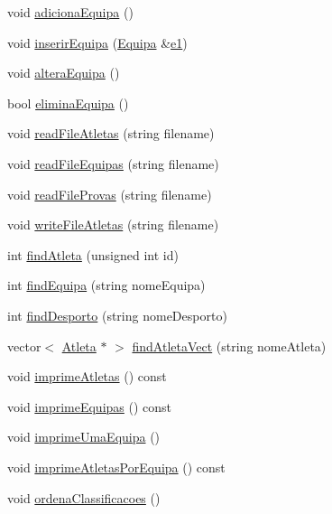 \begin{DoxyCompactItemize}
void \hyperlink{class_campeonato_a61f99e0dac86a67b21facebdc6a6d6a1}{adiciona\+Equipa} ()
\item 
void \hyperlink{class_campeonato_a5c09e9bc272f96875121ef9026c26434}{inserir\+Equipa} (\hyperlink{class_equipa}{Equipa} \&\hyperlink{main_8h_a94bd6f24df224a4dd936a7dba7521ff0}{e1})
\item 
void \hyperlink{class_campeonato_a79600008b0e5fc40b578da54519aee47}{altera\+Equipa} ()
\item 
bool \hyperlink{class_campeonato_a059f992f3a9932dbcf232541640b4b45}{elimina\+Equipa} ()
\item 
void \hyperlink{class_campeonato_a4f443b1fb65733062b40dd529d5ad63e}{read\+File\+Atletas} (string filename)
\item 
void \hyperlink{class_campeonato_a93f60ccc2608b0c99a978bc93fd881ac}{read\+File\+Equipas} (string filename)
\item 
void \hyperlink{class_campeonato_a4098bb3bde66ead9ecaa61e10aef2a5e}{read\+File\+Provas} (string filename)
\item 
void \hyperlink{class_campeonato_a8102c353a574b0ada7d35b537365a54e}{write\+File\+Atletas} (string filename)
\item 
int \hyperlink{class_campeonato_a662db361dc8464fa6ced60048e45ca1a}{find\+Atleta} (unsigned int id)
\item 
int \hyperlink{class_campeonato_a8002616a409e12a1ba2798d60c04f9dc}{find\+Equipa} (string nome\+Equipa)
\item 
int \hyperlink{class_campeonato_a64574dd8d105367c49d794a42e4a2aa8}{find\+Desporto} (string nome\+Desporto)
\item 
vector$<$ \hyperlink{class_atleta}{Atleta} $\ast$ $>$ \hyperlink{class_campeonato_abe0557f6d0fe33787a6d44e85fd8bda3}{find\+Atleta\+Vect} (string nome\+Atleta)
\item 
void \hyperlink{class_campeonato_a6a51ed1d4c6ca51bdc407144589d5894}{imprime\+Atletas} () const 
\item 
void \hyperlink{class_campeonato_a9e43dc72a8bf29c332209a37a8bdb1d8}{imprime\+Equipas} () const 
\item 
void \hyperlink{class_campeonato_a47a2b89c44b6705afa2478109d8b6b78}{imprime\+Uma\+Equipa} ()
\item 
void \hyperlink{class_campeonato_a4bbcc137067e9f72c169e22ce1c28858}{imprime\+Atletas\+Por\+Equipa} () const 
\item 
void \hyperlink{class_campeonato_ae1c0453864ac35ca78f076dd33c5c8a2}{ordena\+Classificacoes} ()
\end{DoxyCompactItemize}
